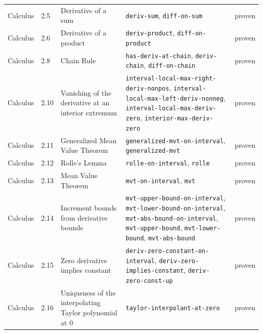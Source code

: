 \begin{longtable}{@{}ll>{\raggedright\arraybackslash}p{4.2cm}>{\raggedright\arraybackslash}p{4.2cm}l@{}}
Calculus & 2.5 & Derivative of a sum & \texttt{deriv-\allowbreak{}sum}, \texttt{diff-\allowbreak{}on-\allowbreak{}sum} & proven \\
Calculus & 2.6 & Derivative of a product & \texttt{deriv-\allowbreak{}product}, \texttt{diff-\allowbreak{}on-\allowbreak{}product} & proven \\
Calculus & 2.8 & Chain Rule & \texttt{has-\allowbreak{}deriv-\allowbreak{}at-\allowbreak{}chain}, \texttt{deriv-\allowbreak{}chain}, \texttt{diff-\allowbreak{}on-\allowbreak{}chain} & proven \\
Calculus & 2.10 & Vanishing of the derivative at an interior extremum & \texttt{interval-\allowbreak{}local-\allowbreak{}max-\allowbreak{}right-\allowbreak{}deriv-\allowbreak{}nonpos}, \texttt{interval-\allowbreak{}local-\allowbreak{}max-\allowbreak{}left-\allowbreak{}deriv-\allowbreak{}nonneg}, \texttt{interval-\allowbreak{}local-\allowbreak{}max-\allowbreak{}deriv-\allowbreak{}zero}, \texttt{interior-\allowbreak{}max-\allowbreak{}deriv-\allowbreak{}zero} & proven \\
Calculus & 2.11 & Generalized Mean Value Theorem & \texttt{generalized-\allowbreak{}mvt-\allowbreak{}on-\allowbreak{}interval}, \texttt{generalized-\allowbreak{}mvt} & proven \\
Calculus & 2.12 & Rolle's Lemma & \texttt{rolle-\allowbreak{}on-\allowbreak{}interval}, \texttt{rolle} & proven \\
Calculus & 2.13 & Mean Value Theorem & \texttt{mvt-\allowbreak{}on-\allowbreak{}interval}, \texttt{mvt} & proven \\
Calculus & 2.14 & Increment bounds from derivative bounds & \texttt{mvt-\allowbreak{}upper-\allowbreak{}bound-\allowbreak{}on-\allowbreak{}interval}, \texttt{mvt-\allowbreak{}lower-\allowbreak{}bound-\allowbreak{}on-\allowbreak{}interval}, \texttt{mvt-\allowbreak{}abs-\allowbreak{}bound-\allowbreak{}on-\allowbreak{}interval}, \texttt{mvt-\allowbreak{}upper-\allowbreak{}bound}, \texttt{mvt-\allowbreak{}lower-\allowbreak{}bound}, \texttt{mvt-\allowbreak{}abs-\allowbreak{}bound} & proven \\
Calculus & 2.15 & Zero derivative implies constant & \texttt{deriv-\allowbreak{}zero-\allowbreak{}constant-\allowbreak{}on-\allowbreak{}interval}, \texttt{deriv-\allowbreak{}zero-\allowbreak{}implies-\allowbreak{}constant}, \texttt{deriv-\allowbreak{}zero-\allowbreak{}const-\allowbreak{}up} & proven \\
Calculus & 2.16 & Uniqueness of the interpolating Taylor polynomial at 0 & \texttt{taylor-\allowbreak{}interpolant-\allowbreak{}at-\allowbreak{}zero} & proven \\

\end{longtable}
